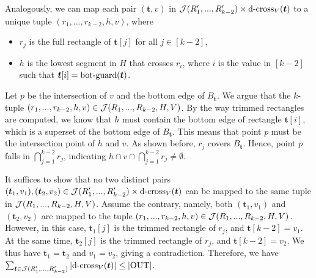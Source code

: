 \vgap 

Analogously, we can map each pair $(\bm{t},v)$ in $\mathcal{J}(R_1',...,R_{k-2}')\times \mathrm{d\text{-}cross}_V(\textrm{\boldmath${t}$})$ to a unique tuple $(r_1,...,r_{k-2},h,v)$, where 
\begin{itemize}
    \item $r_j$ is the full rectangle of $\bm{t}[j]$ for all $j \in [k-2]$,
    \item $h$ is the lowest segment in $H$ that crosses $r_i$, where $i$ is the value in $[k-2]$ such that $\textrm{\boldmath${t}$}[i] = \mathrm{bot\text{-}guard}(\textrm{\boldmath${t}$})$.
\end{itemize}
Let $p$ be the intersection of $v$ and the bottom edge of $B_\bm{t}$. We argue that the $k$-tuple $(r_1, ..., r_{k-2}, h, v)\in \mathcal{J}(R_1,..., R_{k-2},H,V)$. By the way trimmed rectangles are computed, we know that $h$ must contain the bottom edge of rectangle $\bm{t}[i]$, which is a superset of the bottom edge of $B_\bm{t}$. This means that point $p$ must be the intersection point of $h$ and $v$. As shown before, $r_j$ covers $B_\bm{t}$. Hence, point $p$ falls in $\bigcap_{j=1}^{k-2} r_j$, indicating $h \cap v \cap \bigcap_{j=1}^{k-2} r_j \ne \emptyset$. 

\vgap 

It suffices to show that no two distinct pairs $(\textrm{\boldmath${t}$}_1, v_1), (\textrm{\boldmath${t}$}_2, v_2) \in \mathcal{J}(R_1',...,R_{k-2}')\times \mathrm{d\text{-}cross}_V(\textrm{\boldmath${t}$})$ can be mapped to the same tuple in $\mathcal{J}(R_1,..., R_{k-2},H,V)$. Assume the contrary, namely, both $(\bm{t}_1, v_1)$ and $(\bm{t}_2, v_2)$ are mapped to the tuple $(r_1, ..., r_{k-2}, h, v) \in \mathcal{J}(R_1,..., R_{k-2}, H, V)$. However, in this case, $\bm{t}_1[j]$ is the trimmed rectangle of $r_j$, and $\bm{t}[k-2] = v_1$. At the same time, $\bm{t}_2[j]$ is the trimmed rectangle of $r_j$, and $\bm{t}[k-2] = v_2$. We thus have $\bm{t}_1 = \bm{t}_2$ and $v_1 = v_2$, giving a contradiction.
Therefore, we have $\sum_{\textrm{\boldmath${t}$}\in \mathcal{J}(R_1',...,R_{k-2}')}  |\mathrm{d\text{-}cross}_V(\textrm{\boldmath${t}$})| \leq |\mathrm{OUT}|$.